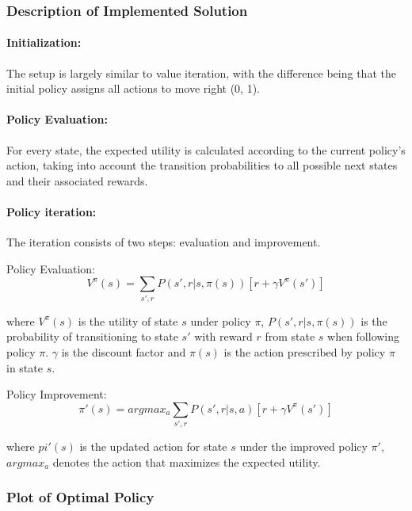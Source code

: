 \documentclass{article}
\begin{document}
\subsubsection{Description of Implemented Solution}

\paragraph{Initialization:} The setup is largely similar to value iteration, with the difference being that the initial policy assigns all actions to move right (0, 1).

\paragraph{Policy Evaluation:} For every state, the expected utility is calculated according to the current policy's action, taking into account the transition probabilities to all possible next states and their associated rewards.

\paragraph{Policy iteration:} The iteration consists of two steps: evaluation and improvement.

Policy Evaluation: 
\[V^\pi (s) = \sum_{s', r} P(s', r|s, \pi(s))[r + \gamma V^\pi (s')] \]

where $V^\pi(s)$ is the utility of state $s$ under policy $\pi$, $P(s', r | s, \pi(s))$ is the probability of transitioning to state $s'$ with reward $r$ from state $s$ when following policy $\pi$. $\gamma$ is the discount factor and $\pi(s)$ is the action prescribed by policy $\pi$ in state $s$.

Policy Improvement:
\[\pi ' (s) = arg max_a \sum_{s', r} P(s', r|s, a)[r + \gamma V^\pi (s')] \]

where $pi '(s)$ is the updated action for state $s$ under the improved policy $\pi '$, $argmax_a$ denotes the action that maximizes the expected utility.

\subsubsection{Plot of Optimal Policy}
\end{document}

